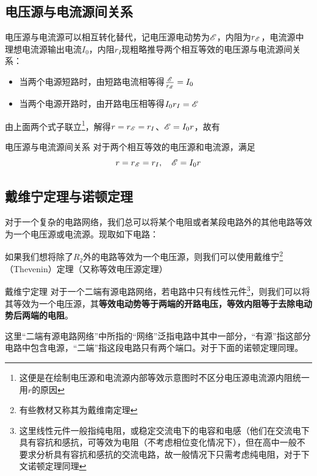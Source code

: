 \subsection{电压源与电流源间关系\quad \dag}
\label{dyydlygx}

电压源与电流源可以相互转化替代，记电压源电动势为$\mathscr{E}$，内阻为$r_{\mathscr{E}}$，电流源中理想电流源输出电流$I_0$，内阻$r_I$现粗略推导两个相互等效的电压源与电流源间关系：

\begin{itemize}
\item 当两个电源短路时，由短路电流相等得$\frac{\mathscr{E}}{r_{\mathscr{E}}} = I_0$
\item 当两个电源开路时，由开路电压相等得$I_0 r_I = \mathscr{E}$
\end{itemize}

由上面两个式子联立\footnote{这便是在绘制电压源和电流源内部等效示意图时不区分电压源电流源内阻统一用$r$的原因}，解得$r = r_{\mathscr{E}} = r_{I}$、$\mathscr{E} = I_0 r $，故有

\begin{theo}{电压源与电流源间关系}{}
对于两个相互等效的电压源和电流源，满足
$$r = r_{\mathscr{E}} = r_{I} ,\quad \mathscr{E} = I_0 r$$
\end{theo}

\subsection{戴维宁定理与诺顿定理}

对于一个复杂的电路网络，我们总可以将某个电阻或者某段电路外的其他电路等效为一个电压源或电流源。现取如下电路：



如果我们想将除了$R_2$外的电路等效为一个电压源，则我们可以使用戴维宁\footnote{有些教材又称其为戴维南定理}（Thevenin）定理（又称等效电压源定理）

\begin{theo}[label=dwndl]{戴维宁定理}{}
对于一个二端有源电路网络，若电路中只有线性元件\footnote{这里线性元件一般指纯电阻，或稳定交流电下的电容和电感（他们在交流电下具有容抗和感抗，可等效为电阻（不考虑相位变化情况下），但在高中一般不要求分析具有容抗和感抗的交流电路，故一般情况下只需考虑纯电阻，对于下文诺顿定理同理}，则我们可以将其等效为一个电压源，其\textbf{等效电动势等于两端的开路电压，等效内阻等于去除电动势后两端的电阻}。

这里“二端有源电路网络”中所指的“网络”泛指电路中其中一部分，“有源”指这部分电路中包含电源，“二端”指这段电路只有两个端口。对于下面的诺顿定理同理。
\end{theo}

